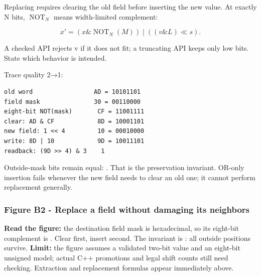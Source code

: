 Replacing requires clearing the old field before inserting the new value. At exactly N bits, \(\operatorname{NOT}_N\) means width-limited complement:

\[
x'=(x\mathbin{\&}\operatorname{NOT}_N(M))
\mathbin{|}((v\mathbin{\&}L)\ll s).
\]

A checked API rejects v if it does not fit; a truncating API keeps only low bits. State which behavior is intended.

Trace quality 2→1:

\begin{verbatim}
old word                 AD = 10101101
field mask               30 = 00110000
eight-bit NOT(mask)       CF = 11001111
clear: AD & CF            8D = 10001101
new field: 1 << 4         10 = 00010000
write: 8D | 10            9D = 10011101
readback: (9D >> 4) & 3    1
\end{verbatim}

Outside-mask bits remain equal: . That is the preservation invariant. OR-only insertion fails whenever the new field needs to clear an old one; it cannot perform replacement generally.

\subsubsection{Figure B2 - Replace a field without damaging its neighbors}\label{01-foundations-i-ch001-figure-b2---replace-a-field-without-damaging-its-neighbors}

\hypertarget{01-foundations-i-ch001-figure-b2---replace-a-field-without-damaging-its-neighbors}{}


\textbf{Read the figure:} the destination field mask is  hexadecimal, so its eight-bit complement is . Clear first, insert second. The invariant is : all outside positions survive. \textbf{Limit:} the figure assumes a validated two-bit value and an eight-bit unsigned model; actual C++ promotions and legal shift counts still need checking. Extraction and replacement formulas appear immediately above.

